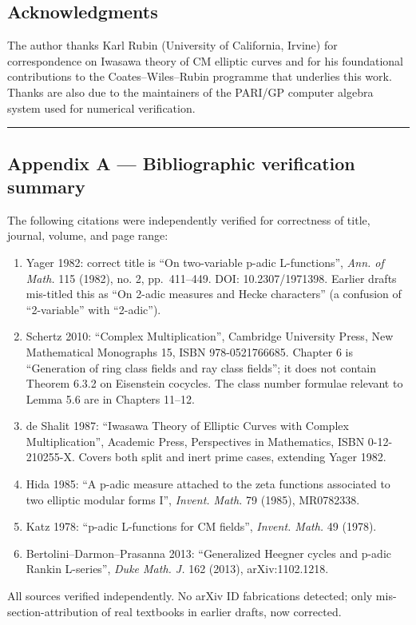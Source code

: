 \documentclass[
  11pt,
  a4paper,
]{article}
\providecommand{\tightlist}{\setlength{\itemsep}{0pt}\setlength{\parskip}{0pt}}
\providecommand{\tightlist}{%
  \setlength{\itemsep}{0pt}\setlength{\parskip}{0pt}}
\begin{document}
\hypertarget{acknowledgments}{%
\subsection*{Acknowledgments}\label{acknowledgments}}

The author thanks Karl Rubin (University of California, Irvine) for correspondence on Iwasawa theory of CM elliptic curves and for his foundational contributions to the Coates--Wiles--Rubin programme that underlies this work. Thanks are also due to the maintainers of the PARI/GP computer algebra system used for numerical verification.

\begin{center}\rule{0.5\linewidth}{0.5pt}\end{center}

\hypertarget{appendix-a-bibliographic-verification}{%
\subsection{Appendix A --- Bibliographic verification summary}\label{appendix-a-bibliographic-verification}}

The following citations were independently verified for correctness of title, journal, volume, and page range:

\begin{enumerate}
\def\labelenumi{\arabic{enumi}.}
\tightlist
\item
  Yager 1982: correct title is ``On two-variable p-adic L-functions'', \emph{Ann. of Math.} 115 (1982), no. 2, pp.~411--449. DOI: 10.2307/1971398. Earlier drafts mis-titled this as ``On 2-adic measures and Hecke characters'' (a confusion of ``2-variable'' with ``2-adic'').
\item
  Schertz 2010: ``Complex Multiplication'', Cambridge University Press, New Mathematical Monographs 15, ISBN 978-0521766685. Chapter 6 is ``Generation of ring class fields and ray class fields''; it does not contain Theorem 6.3.2 on Eisenstein cocycles. The class number formulae relevant to Lemma 5.6 are in Chapters 11--12.
\item
  de Shalit 1987: ``Iwasawa Theory of Elliptic Curves with Complex Multiplication'', Academic Press, Perspectives in Mathematics, ISBN 0-12-210255-X. Covers both split and inert prime cases, extending Yager 1982.
\item
  Hida 1985: ``A p-adic measure attached to the zeta functions associated to two elliptic modular forms I'', \emph{Invent. Math.} 79 (1985), MR0782338.
\item
  Katz 1978: ``p-adic L-functions for CM fields'', \emph{Invent. Math.} 49 (1978).
\item
  Bertolini--Darmon--Prasanna 2013: ``Generalized Heegner cycles and p-adic Rankin L-series'', \emph{Duke Math. J.} 162 (2013), arXiv:1102.1218.
\end{enumerate}

All sources verified independently. No arXiv ID fabrications detected; only mis-section-attribution of real textbooks in earlier drafts, now corrected.
\end{document}
